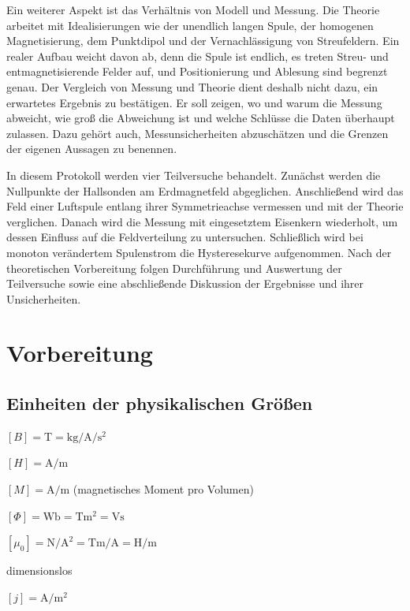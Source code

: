 \documentclass[a4paper,11pt]{article}
\begin{document}
Ein weiterer Aspekt ist das Verhältnis von Modell und Messung. Die Theorie
arbeitet mit Idealisierungen wie der unendlich langen Spule, der homogenen
Magnetisierung, dem Punktdipol und der Vernachlässigung von Streufeldern. Ein
realer Aufbau weicht davon ab, denn die Spule ist endlich, es treten Streu- und
entmagnetisierende Felder auf, und Positionierung und Ablesung sind begrenzt
genau. Der Vergleich von Messung und Theorie dient deshalb nicht dazu, ein
erwartetes Ergebnis zu bestätigen. Er soll zeigen, wo und warum die Messung
abweicht, wie groß die Abweichung ist und welche Schlüsse die Daten
überhaupt zulassen. Dazu gehört auch, Messunsicherheiten abzuschätzen und die
Grenzen der eigenen Aussagen zu benennen.

In diesem Protokoll werden vier Teilversuche behandelt. Zunächst werden die
Nullpunkte der Hallsonden am Erdmagnetfeld abgeglichen. Anschließend wird das
Feld einer Luftspule entlang ihrer Symmetrieachse vermessen und mit der Theorie
verglichen. Danach wird die Messung mit eingesetztem Eisenkern wiederholt, um
dessen Einfluss auf die Feldverteilung zu untersuchen. Schließlich wird bei
monoton verändertem Spulenstrom die Hysteresekurve aufgenommen. Nach der
theoretischen Vorbereitung folgen Durchführung und Auswertung der Teilversuche
sowie eine abschließende Diskussion der Ergebnisse und ihrer Unsicherheiten.

\clearpage

\section{Vorbereitung}

\subsection{Einheiten der physikalischen Größen}
\begin{description}[leftmargin=2.5cm,style=nextline]
  \item[Flussdichte $\vec B$] $[B]=\si{\tesla}=\si{\kilo\gram\per\ampere\per\square\second}$
  \item[Feldstärke $\vec H$] $[H]=\si{\ampere\per\meter}$
  \item[Magnetisierung $\vec M$] $[M]=\si{\ampere\per\meter}$ (magnetisches Moment pro Volumen)
  \item[Magnetischer Fluss $\Phi$] $[\Phi]=\si{\weber}=\si{\tesla\square\meter}=\si{\volt\second}$
  \item[Feldkonstante $\mu_0$] $[\mu_0]=\si{\newton\per\ampere\squared}=\si{\tesla\meter\per\ampere}=\si{\henry\per\meter}$
  \item[Rel. Permeabilität $\mu_\mathrm{r}$] dimensionslos
  \item[Stromdichte $\vec j$] $[j]=\si{\ampere\per\square\meter}$
\end{description}
\end{document}
